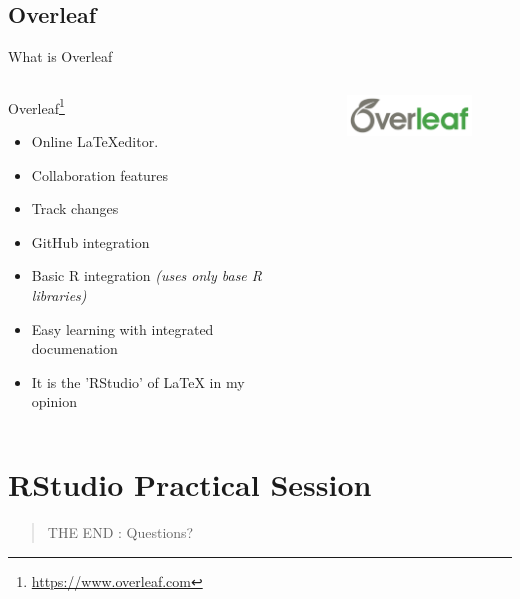 \documentclass[fleqn]{beamer}\usepackage[]{graphicx}\usepackage[]{color}
\begin{document}
\subsection{Overleaf}
\begin{frame}{What is Overleaf}
\begin{columns}[T] %
\begin{column}{.48\textwidth}
Overleaf\footnote{\href{https://www.overleaf.com/edu/nottingham}{https://www.overleaf.com}}
\begin{itemize}
  \item Online \LaTeX editor.
  \item Collaboration features
  \item Track changes
  \item GitHub integration
  \item Basic R integration \textit{(uses only base R libraries)}
  \item Easy learning with integrated documenation
  \item It is the 'RStudio' of \LaTeX{} in my opinion
\end{itemize}
\end{column}%
\hfill%
\begin{column}{.48\textwidth}
\begin{figure}[htp]
    \centering
    \includegraphics[width=4cm]{images/overleaf_wide_colour_light_bg}
\end{figure}
\end{column}%
\end{columns}
\end{frame}

% 
% 

\section{RStudio Practical Session}
\begin{frame}
\centering
\begin{quote}
THE END : Questions?
\end{quote}

\end{frame}
\end{document}
